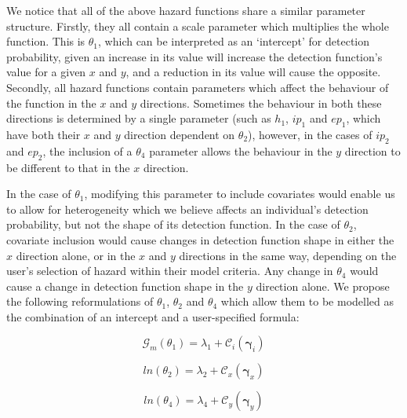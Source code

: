 \documentclass[11pt]{article}
\begin{document}
\begin{multicols}{2}
We notice that all of the above hazard functions share a similar parameter structure. Firstly, they all contain a scale parameter which multiplies the whole function. This is $\theta_1$, which can be interpreted as an `intercept' for detection probability, given an increase in its value will increase the detection function's value for a given $x$ and $y$, and a reduction in its value will cause the opposite. Secondly, all hazard functions contain parameters which affect the behaviour of the function in the $x$ and $y$ directions. Sometimes the behaviour in both these directions is determined by a single parameter (such as $h_1$, $ip_1$ and $ep_1$, which have both their $x$ and $y$ direction dependent on $\theta_2$), however, in the cases of $ip_2$ and $ep_2$, the inclusion of a $\theta_4$ parameter allows the behaviour in the $y$ direction to be different to that in the $x$ direction.

In the case of $\theta_1$, modifying this parameter to include covariates would enable us to allow for heterogeneity which we believe affects an individual's detection probability, but not the shape of its detection function. In the case of $\theta_2$, covariate inclusion would cause changes in detection function shape in either the $x$ direction alone, or in the $x$ and $y$ directions in the same way, depending on the user's selection of hazard within their model criteria. Any change in $\theta_4$ would cause a change in detection function shape in the $y$ direction alone. We propose the following reformulations of $\theta_1$, $\theta_2$ and $\theta_4$ which allow them to be modelled as the combination of an intercept and a user-specified formula:

\begingroup
\large
\begin{equation}
\mathcal{G}_m\left(\theta_1\right) = \lambda_1 + \mathcal{C}_i\left(\boldsymbol{\gamma}_i\right)
\end{equation}

\begin{equation}
ln\left(\theta_2\right) = \lambda_2 + \mathcal{C}_x\left(\boldsymbol{\gamma}_x\right)
\end{equation}

\begin{equation}
ln\left(\theta_4\right) = \lambda_4 + \mathcal{C}_y\left(\boldsymbol{\gamma}_y\right)
\end{equation}
\endgroup


\end{multicols}
\end{document}
